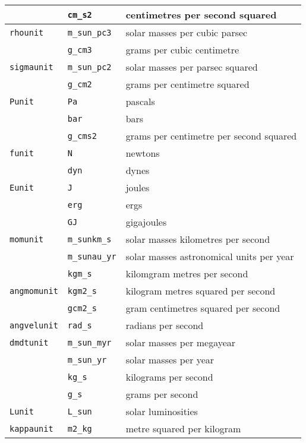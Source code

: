 \documentclass[a4paper]{article}
\newcommand{\var}[1]{\texttt{#1}}
\begin{document}
\begin{center}
\begin{supertabular}{|p{3cm}|p{3cm}|p{6cm}|}
                & \var{cm\_s2}    & centimetres per second squared \\ \hline
\var{rhounit}   & \var{m\_sun\_pc3} & solar masses per cubic parsec \\
                & \var{g\_cm3}     & grams per cubic centimetre \\ \hline
\var{sigmaunit} & \var{m\_sun\_pc2} & solar masses per parsec squared \\
                & \var{g\_cm2}     & grams per centimetre squared \\ \hline
\var{Punit}     & \var{Pa}        & pascals \\
                & \var{bar}       & bars \\
                & \var{g\_cms2}    & grams per centimetre per second squared \\
\hline
\var{funit}     & \var{N}         & newtons  \\ 
                & \var{dyn}       & dynes    \\ \hline
\var{Eunit}     & \var{J}         & joules \\
                & \var{erg}       & ergs \\
                & \var{GJ}        & gigajoules \\ \hline
\var{momunit}   & \var{m\_sunkm\_s} & solar masses kilometres per second \\
                & \var{m\_sunau\_yr}& solar masses astronomical units per year \\
                & \var{kgm\_s}    & kilomgram metres per second \\
\hline
\var{angmomunit}& \var{kgm2\_s}  & kilogram metres squared per second \\
                & \var{gcm2\_s}   & gram centimetres squared per second \\ 
\hline
\var{angvelunit}& \var{rad\_s}   & radians per second \\
\hline
\var{dmdtunit}  & \var{m\_sun\_myr} & solar masses per megayear \\
                & \var{m\_sun\_yr}  & solar masses per year \\
                & \var{kg\_s}       & kilograms per second \\
                & \var{g\_s}        & grams per second \\ \hline
\var{Lunit}     & \var{L\_sun}    & solar luminosities \\ \hline
\var{kappaunit} & \var{m2\_kg}    & metre squared per kilogram \\

\end{supertabular}
\end{center}
\end{document}
